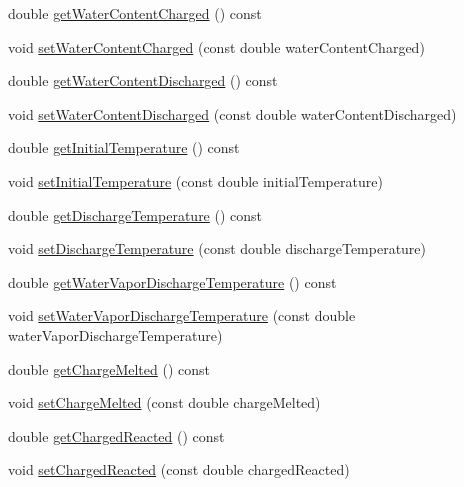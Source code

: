 \begin{DoxyCompactItemize}
\item 
double \hyperlink{class_solid_load_charge_material_a2f99a8553d12b45bad53acc14338199a}{get\+Water\+Content\+Charged} () const
\item 
void \hyperlink{class_solid_load_charge_material_abf43422318a1b9120dff1dcfb15d5265}{set\+Water\+Content\+Charged} (const double water\+Content\+Charged)
\item 
double \hyperlink{class_solid_load_charge_material_aeeb6b341a6b5770155b85264dabbd1a7}{get\+Water\+Content\+Discharged} () const
\item 
void \hyperlink{class_solid_load_charge_material_a5104ddb43af977a751b90a0bc844d83d}{set\+Water\+Content\+Discharged} (const double water\+Content\+Discharged)
\item 
double \hyperlink{class_solid_load_charge_material_ae5d7f198fb1d4a3adb0cfc911a13ea06}{get\+Initial\+Temperature} () const
\item 
void \hyperlink{class_solid_load_charge_material_ac80e565d26e68e542f4cb41f41b7d96c}{set\+Initial\+Temperature} (const double initial\+Temperature)
\item 
double \hyperlink{class_solid_load_charge_material_afcb8c00c2e23ad1444f34960b19835a0}{get\+Discharge\+Temperature} () const
\item 
void \hyperlink{class_solid_load_charge_material_adf73bc8d656a501cae5ad68af7a7c4fb}{set\+Discharge\+Temperature} (const double discharge\+Temperature)
\item 
double \hyperlink{class_solid_load_charge_material_a267f26d42f8ba2655c09f561fc0f6cb1}{get\+Water\+Vapor\+Discharge\+Temperature} () const
\item 
void \hyperlink{class_solid_load_charge_material_af7837868e494c16aba5a2c3e1220106d}{set\+Water\+Vapor\+Discharge\+Temperature} (const double water\+Vapor\+Discharge\+Temperature)
\item 
double \hyperlink{class_solid_load_charge_material_ad9ab52fe5861f48b763fe300851df69a}{get\+Charge\+Melted} () const
\item 
void \hyperlink{class_solid_load_charge_material_a9999a2976e8a8662a86cc2a159df5202}{set\+Charge\+Melted} (const double charge\+Melted)
\item 
double \hyperlink{class_solid_load_charge_material_a7c7f05b6ee14eb5f07e5c48c30e9c7a1}{get\+Charged\+Reacted} () const
\item 
void \hyperlink{class_solid_load_charge_material_a38f3b832ff29f779a78a51fd7352fcd4}{set\+Charged\+Reacted} (const double charged\+Reacted)
\item 

\end{DoxyCompactItemize}
